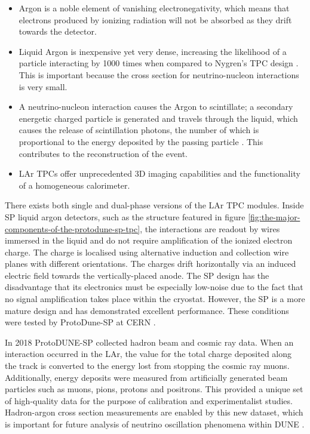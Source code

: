 \documentclass[10pt]{article}
\begin{document}
\begin{itemize}
	\item Argon is a noble element of vanishing electronegativity, which means that electrons produced by ionizing radiation will not be absorbed as they drift towards the detector.
	\item  Liquid Argon is inexpensive yet very dense, increasing the likelihood of a particle interacting by 1000 times when compared to Nygren's TPC design \cite{rubbia1977liquid}. This is important because the cross section for neutrino-nucleon interactions is very small.
	\item A neutrino-nucleon interaction causes the Argon to scintillate; a secondary energetic charged particle is generated and travels through the liquid, which causes the release of scintillation photons, the number of which is proportional to the energy deposited by the passing particle \cite{adams2018rejecting}. This contributes to the reconstruction of the event.
	\item LAr TPCs offer unprecedented 3D imaging capabilities and the functionality of a homogeneous calorimeter. 
	
\end{itemize}

There exists both single and dual-phase versions of the LAr TPC modules. Inside SP liquid argon detectors, such as the structure featured in figure \ref{fig:the-major-components-of-the-protodune-sp-tpc}, the interactions are readout by wires immersed in the liquid and do not require amplification of the ionized electron charge. The charge is localised using alternative induction and collection wire planes with different orientations. The charges drift horizontally via an induced electric field towards the vertically-placed anode. The SP design has the disadvantage that its electronics must be especially low-noise due to the fact that no signal amplification takes place within the cryostat. However, the SP is a more mature design and has demonstrated excellent performance. These conditions were tested by ProtoDune-SP at CERN \cite{dune_sp_collab}.

In 2018 ProtoDUNE-SP collected hadron beam and cosmic ray data. When an interaction occurred in the LAr, the value for the total charge deposited along the track is converted to the energy lost from stopping the cosmic ray muons. Additionally, energy deposits were measured from artificially generated beam particles such as muons, pions, protons and positrons. This provided a unique set of high-quality data for the purpose of calibration and experimentalist studies. Hadron-argon cross section measurements are enabled by this new dataset, which is important for future analysis of neutrino oscillation phenomena within DUNE \cite{abi2020volume}.
 
\end{document}
